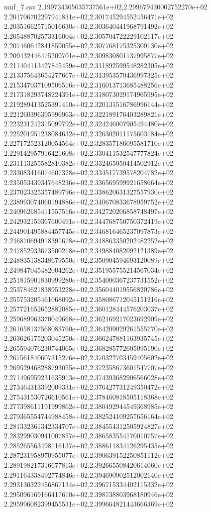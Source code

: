 \begin{filecontents*}{muf_7.csv}
2.199734365635737561e+02,2.299679430002752270e+02
2.201706702297941831e+02,2.301745294552456471e+02
2.203516625715016630e+02,2.303640441968791492e+02
2.205488702573316004e+02,2.305704722229102117e+02
2.207460642841859055e+02,2.307768175325309130e+02
2.209432446475209701e+02,2.309830801137995877e+02
2.211404113427845459e+02,2.311892599548282305e+02
2.213375643654277667e+02,2.313953570436997325e+02
2.215347037109506516e+02,2.316013713685488256e+02
2.217318293748224391e+02,2.318073029174965995e+02
2.219289413525391410e+02,2.320131516786996144e+02
2.221260396395996963e+02,2.322189176403289821e+02
2.223231242315099792e+02,2.324246007905494480e+02
2.225201951238084632e+02,2.326302011175603184e+02
2.227172523120054564e+02,2.328357186095581710e+02
2.229142957916421608e+02,2.330411532547777824e+02
2.231113255582810382e+02,2.332465050414502912e+02
2.233083416074607328e+02,2.334517739578204782e+02
2.235053439347648236e+02,2.336569599921658664e+02
2.237023325357489796e+02,2.338620631327557930e+02
2.238993074060194886e+02,2.340670833678959752e+02
2.240962685411557516e+02,2.342720206858748497e+02
2.242932159367600491e+02,2.344768750750372419e+02
2.244901495884457745e+02,2.346816465237097873e+02
2.246870694918391678e+02,2.348863350202482252e+02
2.247852933673500218e+02,2.349884082092121389e+02
2.248835138348679550e+02,2.350904594693120089e+02
2.249847045482004262e+02,2.351955755214567034e+02
2.251815901830999280e+02,2.354000367237731552e+02
2.253784621838953228e+02,2.356044019556820786e+02
2.255753205461068092e+02,2.358086712045151216e+02
2.257721652652882085e+02,2.360128444576203037e+02
2.259689963370049668e+02,2.362169217023692909e+02
2.261658137568083760e+02,2.364209029261555770e+02
2.263626175203045250e+02,2.366247881163935745e+02
2.265594076230744065e+02,2.368285772605095190e+02
2.267561840607315276e+02,2.370322703459405602e+02
2.269529468288793055e+02,2.372358673601547707e+02
2.271496959231635913e+02,2.374393682906566028e+02
2.273464313392009331e+02,2.376427731249350472e+02
2.275431530726610561e+02,2.378460818505118368e+02
2.277398611191999862e+02,2.380492944549368985e+02
2.279365554744988458e+02,2.382524109257656164e+02
2.281332361342334707e+02,2.384554312505924827e+02
2.283299030941007857e+02,2.386583554170010757e+02
2.285265563498116137e+02,2.388611834126295435e+02
2.287231958970955077e+02,2.390639152250851112e+02
2.289198217316677813e+02,2.392665508420614060e+02
2.291164338492774846e+02,2.394690902512002140e+02
2.293130322456867134e+02,2.396715334402115332e+02
2.295096169166417610e+02,2.398738803968180946e+02
2.295996082399455531e+02,2.399664821443666369e+02

\end{filecontents*}
